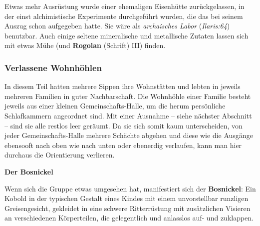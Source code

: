 Etwas mehr Ausrüstung wurde einer ehemaligen Eisenhütte zurückgelassen, in der einst alchimistische Experimente durchgeführt wurden, die das \fkv bei seinem Auszug schon aufgegeben hatte.
Sie wäre als \emph{archaisches Labor} (\emph{Ilaris:64}) benutzbar.
Auch einige seltene mineralische und metallische Zutaten lassen sich mit etwas Mühe (und \textbf{Rogolan} (Schrift) III) finden.

\vfill

\subsubsection{Verlassene Wohnhöhlen}
In diesem Teil hatten mehrere Sippen ihre Wohnstätten und lebten in jeweils mehreren Familien in guter Nachbarschaft.
Die Wohnhöhle einer Familie besteht jeweils aus einer kleinen Gemeinschafts-Halle, um die herum persönliche Schlafkammern angeordnet sind.
Mit einer Ausnahme -- siehe nächster Abschnitt -- sind sie alle restlos leer geräumt.
Da sie sich somit kaum unterscheiden, von jeder Gemeinschafts-Halle mehrere Schächte abgehen und diese wie die Ausgänge ebensooft nach oben wie nach unten oder ebenerdig verlaufen, kann man hier durchaus die Orientierung verlieren.

\neuespalte

\textbf{Der Bosnickel}


Wenn sich die Gruppe etwas umgesehen hat, manifestiert sich der \textbf{Bosnickel}:
Ein Kobold in der typischen Gestalt eines Kindes mit einem unvorstellbar runzligen Greisengesicht,
gekleidet in eine schwere Ritterrüstung mit zusätzlichen Visieren an verschiedenen Körperteilen,
die gelegentlich und anlasslos auf- und zuklappen.


